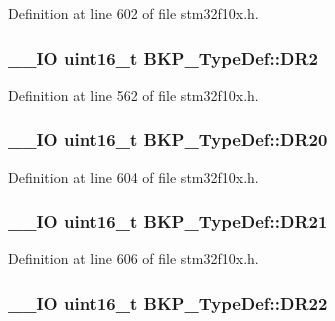 Definition at line 602 of file stm32f10x.\-h.

\hypertarget{struct_b_k_p___type_def_a98d088136a3ba92025a8381d9a19f7b0}{
\subsubsection[{D\-R2}]{\setlength{\rightskip}{0pt plus 5cm}\-\_\-\-\_\-\-I\-O {\bf uint16\-\_\-t} B\-K\-P\-\_\-\-Type\-Def\-::\-D\-R2}}\label{struct_b_k_p___type_def_a98d088136a3ba92025a8381d9a19f7b0}


Definition at line 562 of file stm32f10x.\-h.

\hypertarget{struct_b_k_p___type_def_a107bde73006459510e9ba42579f6c327}{
\subsubsection[{D\-R20}]{\setlength{\rightskip}{0pt plus 5cm}\-\_\-\-\_\-\-I\-O {\bf uint16\-\_\-t} B\-K\-P\-\_\-\-Type\-Def\-::\-D\-R20}}\label{struct_b_k_p___type_def_a107bde73006459510e9ba42579f6c327}


Definition at line 604 of file stm32f10x.\-h.

\hypertarget{struct_b_k_p___type_def_a89180a525bf44cd1747dd97102de7a5a}{
\subsubsection[{D\-R21}]{\setlength{\rightskip}{0pt plus 5cm}\-\_\-\-\_\-\-I\-O {\bf uint16\-\_\-t} B\-K\-P\-\_\-\-Type\-Def\-::\-D\-R21}}\label{struct_b_k_p___type_def_a89180a525bf44cd1747dd97102de7a5a}


Definition at line 606 of file stm32f10x.\-h.

\hypertarget{struct_b_k_p___type_def_a9f077d302b8fb5f113416919de36c1fb}{
\subsubsection[{D\-R22}]{\setlength{\rightskip}{0pt plus 5cm}\-\_\-\-\_\-\-I\-O {\bf uint16\-\_\-t} B\-K\-P\-\_\-\-Type\-Def\-::\-D\-R22}}\label{struct_b_k_p___type_def_a9f077d302b8fb5f113416919de36c1fb}


